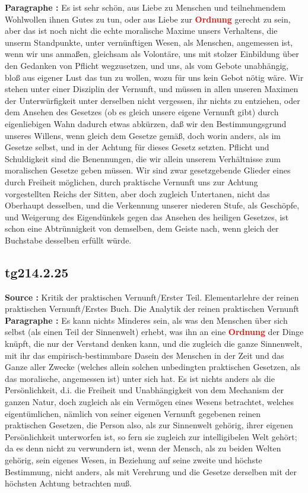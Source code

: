 \documentclass[a4paper,12pt,twoside]{book}
\newcommand{\match}[1]{\textcolor{red}{\textbf{#1}}}
\begin{document}
	\noindent\textbf{Paragraphe : }Es ist sehr schön, aus Liebe zu Menschen und teilnehmendem Wohlwollen ihnen Gutes zu tun, oder aus Liebe zur \match{Ordnung} gerecht zu sein, aber das ist noch nicht die echte moralische Maxime unsers Verhaltens, die unserm Standpunkte, unter vernünftigen Wesen, als Menschen, angemessen ist, wenn wir uns anmaßen, gleichsam als Volontäre, uns mit stolzer Einbildung über den Gedanken von Pflicht wegzusetzen, und uns, als vom Gebote unabhängig, bloß aus eigener Lust das tun zu wollen, wozu für uns kein Gebot nötig wäre. Wir stehen unter einer Disziplin der Vernunft, und müssen in allen unseren Maximen der Unterwürfigkeit unter derselben nicht vergessen, ihr nichts zu entziehen, oder dem Ansehen des Gesetzes (ob es gleich unsere eigene Vernunft gibt) durch eigenliebigen Wahn dadurch etwas abkürzen, daß wir den Bestimmungsgrund unseres Willens, wenn gleich dem Gesetze gemäß, doch worin anders, als im Gesetze selbst, und in der Achtung für dieses Gesetz setzten. Pflicht und Schuldigkeit sind die Benennungen, die wir allein unserem Verhältnisse zum moralischen Gesetze geben müssen. Wir sind zwar gesetzgebende Glieder eines durch Freiheit möglichen, durch praktische Vernunft  uns zur Achtung vorgestellten Reichs der Sitten, aber doch zugleich Untertanen, nicht das Oberhaupt desselben, und die Verkennung unserer niederen Stufe, als Geschöpfe, und Weigerung des Eigendünkels gegen das Ansehen des heiligen Gesetzes, ist schon eine Abtrünnigkeit von demselben, dem Geiste nach, wenn gleich der Buchstabe desselben erfüllt würde. 
	
	\subsection*{tg214.2.25} 
	\textbf{Source : }Kritik der praktischen Vernunft/Erster Teil. Elementarlehre der reinen praktischen Vernunft/Erstes Buch. Die Analytik der reinen praktischen Vernunft\\  
	
	\noindent\textbf{Paragraphe : }Es kann nichts Minderes sein, als was den Menschen über sich selbst (als einen Teil der Sinnenwelt) erhebt, was ihn an eine \match{Ordnung} der Dinge knüpft, die nur der Verstand denken kann, und die zugleich die ganze Sinnenwelt, mit ihr das empirisch-bestimmbare Dasein des Menschen in der  Zeit und das Ganze aller Zwecke (welches allein solchen unbedingten praktischen Gesetzen, als das moralische, angemessen ist) unter sich hat. Es ist nichts anders als die Persönlichkeit, d.i. die Freiheit und Unabhängigkeit von dem Mechanism der ganzen Natur, doch zugleich als ein Vermögen eines Wesens betrachtet, welches eigentümlichen, nämlich von seiner eigenen Vernunft gegebenen reinen praktischen Gesetzen, die Person also, als zur Sinnenwelt gehörig, ihrer eigenen Persönlichkeit unterworfen ist, so fern sie zugleich zur intelligibelen Welt gehört; da es denn nicht zu verwundern ist, wenn der Mensch, als zu beiden Welten gehörig, sein eigenes Wesen, in Beziehung auf seine zweite und höchste Bestimmung, nicht anders, als mit Verehrung und die Gesetze derselben mit der höchsten Achtung betrachten muß. 
	
\end{document}
